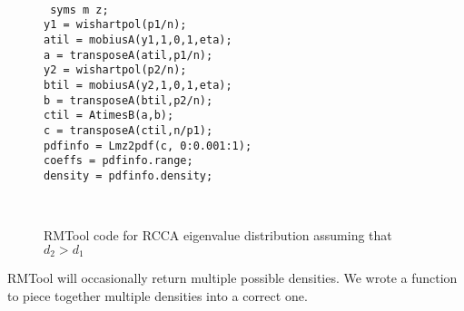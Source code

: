 \begin{figure}        
  \hrulefill\\
  \texttt{
    syms m z;    \\
    y1 = wishartpol(p1/n);   \\
    atil = mobiusA(y1,1,0,1,eta);\\
    a = transposeA(atil,p1/n);\\                                
    y2 = wishartpol(p2/n);\\
    btil = mobiusA(y2,1,0,1,eta);\\
    b = transposeA(btil,p2/n);\\
    ctil = AtimesB(a,b);\\
    c = transposeA(ctil,n/p1);\\    
    pdfinfo = Lmz2pdf(c, 0:0.001:1);  \\
    coeffs = pdfinfo.range;\\
    density = pdfinfo.density;\\
  }      
  \caption{RMTool {} code for RCCA eigenvalue distribution assuming that
    $d_2>d_1$}
  \label{fig:rcca_rmtool}
  \hrulefill \\
\end{figure}

RMTool will occasionally return multiple possible densities. We wrote a function to piece
together multiple densities into a correct one. 

